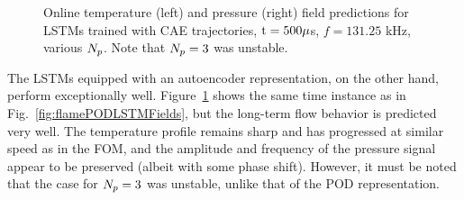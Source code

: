 \begin{figure}
\begin{minipage}{0.49\linewidth}
    \end{minipage}
    \caption{\label{fig:flameCAELSTMFields}Online temperature (left) and pressure (right) field predictions for LSTMs trained with CAE trajectories, $\text{t} = 500 \mu$s, $f = 131.25$ kHz, various $N_p$. Note that $N_p = 3$ was unstable.}
\end{figure}

The LSTMs equipped with an autoencoder representation, on the other hand, perform exceptionally well. Figure~\ref{fig:flameCAELSTMFields} shows the same time instance as in Fig.~\ref{fig:flamePODLSTMFields}, but the long-term flow behavior is predicted very well. The temperature profile remains sharp and has progressed at similar speed as in the FOM, and the amplitude and frequency of the pressure signal appear to be preserved (albeit with some phase shift). However, it must be noted that the case for $N_p = 3$ was unstable, unlike that of the POD representation.

